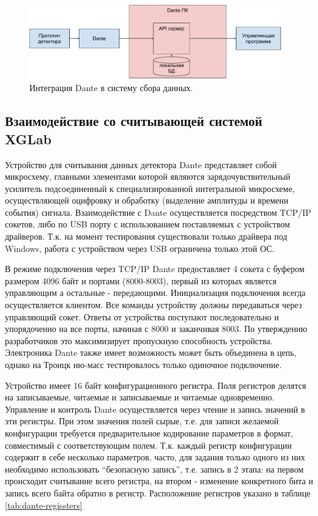 \documentclass[a4paper,14pt]{extreport}
\begin{document}
\begin{figure}
  \centering
  \includegraphics[width = 0.98\textwidth]{img/dante/integration.pdf}
    \caption{Интеграция Dante в систему сбора данных.}
    \label{fig:dante-integration}
\end{figure}

\subsection{Взаимодействие со считывающей системой XGLab}

Устройство для считывания данных детектора Dante представляет собой микросхему, главными элементами которой являются зарядочувствительный усилитель подсоединенный к специализированной интегральной микросхеме, осуществляющей оцифровку и обработку (выделение амплитуды и времени события) сигнала. Взаимодействие с Dante осуществляется посредством TCP/IP сокетов, либо по USB порту с использованием поставляемых с устройством драйверов. Т.к. на момент тестирования существовали только драйвера под Windows, работа с устройством через USB ограничена только этой ОС.

В режиме подключения через TCP/IP Dante предоставляет 4 сокета с буфером размером 4096 байт и портами (8000-8003), первый из которых является управляющим а остальные - передающими. Инициализация подключения всегда осуществляется клиентом. Все команды устройству должны передаваться через управляющий сокет. Ответы от устройства поступают последовательно и упорядоченно на все порты, начиная с 8000 и заканчивая 8003. По утверждению разработчиков это максимизирует пропускную способность устройства. Электроника Dante также имеет возможность может быть объединена в цепь, однако на Троицк ню-масс тестировалось только одиночное подключение.

Устройство имеет 16 байт конфигурационного регистра. Поля регистров делятся на записываемые, читаемые и записываемые и читаемые одновременно. Управление и контроль Dante осуществляется через чтение и запись значений в эти регистры. При этом значения полей сырые, т.е. для записи желаемой конфигурации требуется предварительное кодирование параметров в формат, совместимый с соответствующим полем. Т.к. каждый регистр конфигурации содержит в себе несколько параметров, часто, для задания только одного из них необходимо использовать “безопасную запись”, т.е. запись в 2 этапа: на первом происходит считывание всего регистра, на втором - изменение конкретного бита и запись всего байта обратно в регистр. Расположение регистров указано в таблице \ref{tab:dante-regissters}
\end{document}
